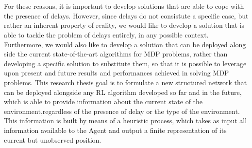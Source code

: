     \\\\
    For these reasons, it is important to develop solutions that are able to cope with the presence of delays. However, since delays do not consistute a specific case, but rather an inherent property of reality, we would like to develop a solution that is able to tackle the problem of delays entirely, in any possible context. Furthermore, we would also like to develop a solution that can be deployed along side the current state-of-the-art algorithms for MDP problems, rather than developing a specific solution to substitute them, so that it is possible to leverage upon present and future results and performances achieved in solving MDP problems. This research thesis goal is to formulate a new structured network that can be deployed alongside any RL algorithm developed so far and in the future, which is able to provide information about the current state of the environment,regardless of the presence of delay or the type of the environment. This information is built by means of a heuristic process, which takes as input all information available to the Agent and output a finite representation of its current but unobserved position.
